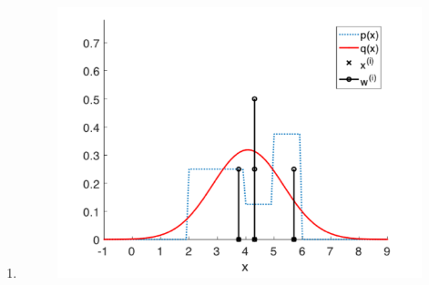 \begin{enumerate}
\begin{enumerate}
\item \begin{figure}[!htb]
\begin{center}
\includegraphics[scale=0.320]{img/particle_filters/P3_7_3_4_ex1.png}
\end{center}
\label{P3_7_3_4_ex1}
\end{figure}
\end{enumerate}


\end{enumerate}




